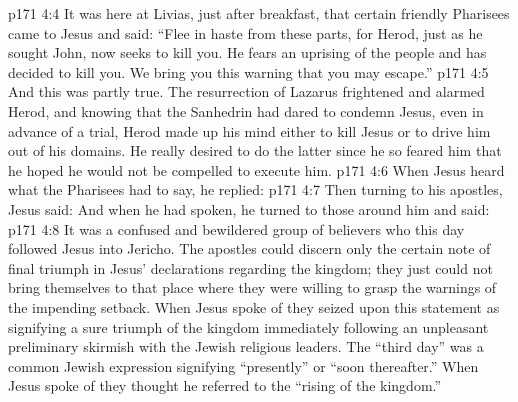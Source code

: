 \vs p171 4:4 \pc It was here at Livias, just after breakfast, that certain friendly Pharisees came to Jesus and said: “Flee in haste from these parts, for Herod, just as he sought John, now seeks to kill you. He fears an uprising of the people and has decided to kill you. We bring you this warning that you may escape.”
\vs p171 4:5 And this was partly true. The resurrection of Lazarus frightened and alarmed Herod, and knowing that the Sanhedrin had dared to condemn Jesus, even in advance of a trial, Herod made up his mind either to kill Jesus or to drive him out of his domains. He really desired to do the latter since he so feared him that he hoped he would not be compelled to execute him.
\vs p171 4:6 When Jesus heard what the Pharisees had to say, he replied: 
\vs p171 4:7 Then turning to his apostles, Jesus said:  And when he had spoken, he turned to those around him and said: 
\vs p171 4:8 \pc It was a confused and bewildered group of believers who this day followed Jesus into Jericho. The apostles could discern only the certain note of final triumph in Jesus’ declarations regarding the kingdom; they just could not bring themselves to that place where they were willing to grasp the warnings of the impending setback. When Jesus spoke of  they seized upon this statement as signifying a sure triumph of the kingdom immediately following an unpleasant preliminary skirmish with the Jewish religious leaders. The “third day” was a common Jewish expression signifying “presently” or “soon thereafter.” When Jesus spoke of  they thought he referred to the “rising of the kingdom.”
